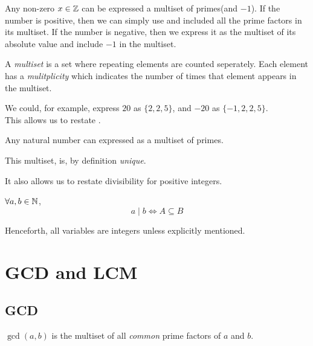 \begin{claim}
    Any non-zero \(x \in \mathbb Z\) can be expressed a multiset of primes(and \(-1\)). If the number is positive, then we can simply use  and included all the prime factors in its multiset. If the number is negative, then we express it as the multiset of its absolute value and include \(-1\) in the multiset.
\end{claim}

\begin{remark}
    A \textit{multiset} is a set where repeating elements are counted seperately. Each element has a \textit{mulitplicity} which indicates the number of times that element appears in the multiset.
\end{remark}

We could, for example, express \(20\) as \(\{2, 2, 5\}\), and \(-20\) as \(\{-1, 2, 2, 5\}\).
\\
This allows us to restate .

\begin{theorem}
    Any natural number can expressed as a multiset of primes.
\end{theorem}

\begin{remark}
    This multiset, is, by definition \textit{unique}.
\end{remark}

It also allows us to restate divisibility for positive integers.

\begin{theorem}
    \(\forall a, b \in \mathbb N\), \[a \mid b \iff A \subseteq B \]
\end{theorem}

\begin{remark}
    Henceforth, all variables are integers unless explicitly mentioned.
\end{remark}

\section{GCD and LCM}

\subsection{GCD}

\begin{definition}
    \( \gcd(a,b)\) is the multiset of all \textit{common} prime factors of \(a\) and \(b\).
\end{definition}


